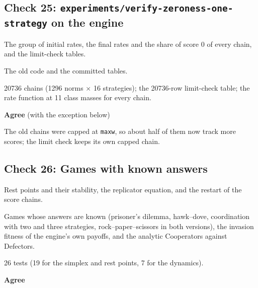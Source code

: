 \subsection*{Check 25: \texttt{experiments/verify-zeroness-one-strategy} on the engine}

\begin{description}\setlength\itemsep{0pt}

\item[What was checked] The group of initial rates, the final rates and the share of score 0 of every chain, and the limit-check tables.

\item[Checked against] The old code and the committed tables.

\item[How many] 20736 chains (1296 norms $\times$ 16 strategies); the 20736-row limit-check table; the rate function at 11 class masses for every chain.

\item[Result] \textbf{Agree} (with the exception below)

\item[Note] The old chains were capped at \texttt{maxw}, so about half of them now track more scores; the limit check keeps its own capped chain.

\end{description}


\subsection*{Check 26: Games with known answers}

\begin{description}\setlength\itemsep{0pt}

\item[What was checked] Rest points and their stability, the replicator equation, and the restart of the score chains.

\item[Checked against] Games whose answers are known (prisoner's dilemma, hawk--dove, coordination with two and three strategies, rock--paper--scissors in both versions), the invasion fitness of the engine's own payoffs, and the analytic Cooperators against Defectors.

\item[How many] 26 tests (19 for the simplex and rest points, 7 for the dynamics).

\item[Result] \textbf{Agree}

\end{description}


